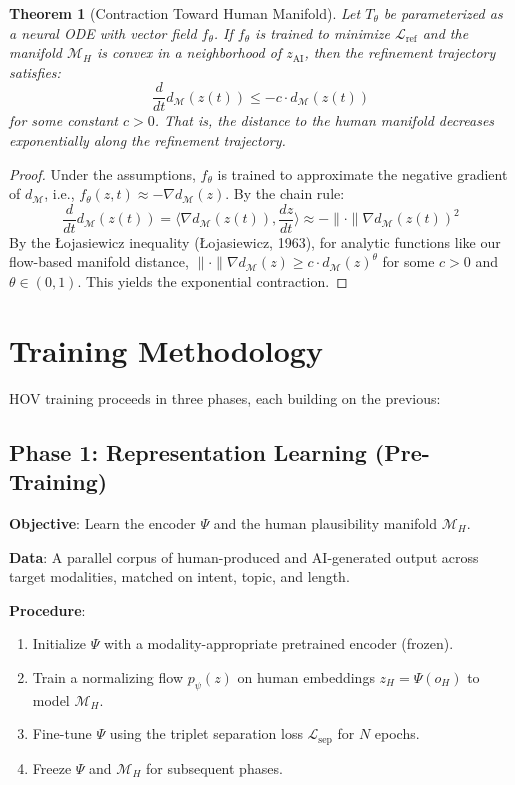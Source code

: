 \documentclass[12pt,oneside]{article}
\newtheorem{theorem}{Theorem}[section]
\newcommand{\norm}{\|\cdot\|}
\begin{document}
\begin{theorem}[Contraction Toward Human Manifold]
Let $T_\theta$ be parameterized as a neural ODE with vector field $f_\theta$. If $f_\theta$ is trained to minimize $\mathcal{L}_\text{ref}$ and the manifold $\mathcal{M}_H$ is convex in a neighborhood of $z_\text{AI}$, then the refinement trajectory satisfies:
\begin{equation}
\frac{d}{dt} d_\mathcal{M}(z(t)) \leq -c \cdot d_\mathcal{M}(z(t))
\end{equation}
for some constant $c > 0$. That is, the distance to the human manifold decreases exponentially along the refinement trajectory.
\end{theorem}

\begin{proof}
Under the assumptions, $f_\theta$ is trained to approximate the negative gradient of $d_\mathcal{M}$, i.e., $f_\theta(z, t) \approx -\nabla d_\mathcal{M}(z)$. By the chain rule:
\[
\frac{d}{dt} d_\mathcal{M}(z(t)) = \langle \nabla d_\mathcal{M}(z(t)), \frac{dz}{dt} \rangle \approx -\norm{\nabla d_\mathcal{M}(z(t))}^2
\]
By the Łojasiewicz inequality (Łojasiewicz, 1963), for analytic functions like our flow-based manifold distance, $\norm{\nabla d_\mathcal{M}(z)} \geq c \cdot d_\mathcal{M}(z)^\theta$ for some $c > 0$ and $\theta \in (0, 1)$. This yields the exponential contraction.
\end{proof}

\section{Training Methodology}

HOV training proceeds in three phases, each building on the previous:

\subsection{Phase 1: Representation Learning (Pre-Training)}

\textbf{Objective}: Learn the encoder $\Psi$ and the human plausibility manifold $\mathcal{M}_H$.

\textbf{Data}: A parallel corpus of human-produced and AI-generated output across target modalities, matched on intent, topic, and length.

\textbf{Procedure}:
\begin{enumerate}[noitemsep]
    \item Initialize $\Psi$ with a modality-appropriate pretrained encoder (frozen).
    \item Train a normalizing flow $p_\psi(z)$ on human embeddings $z_H = \Psi(o_H)$ to model $\mathcal{M}_H$.
    \item Fine-tune $\Psi$ using the triplet separation loss $\mathcal{L}_\text{sep}$ for $N$ epochs.
    \item Freeze $\Psi$ and $\mathcal{M}_H$ for subsequent phases.
\end{enumerate}
\end{document}
